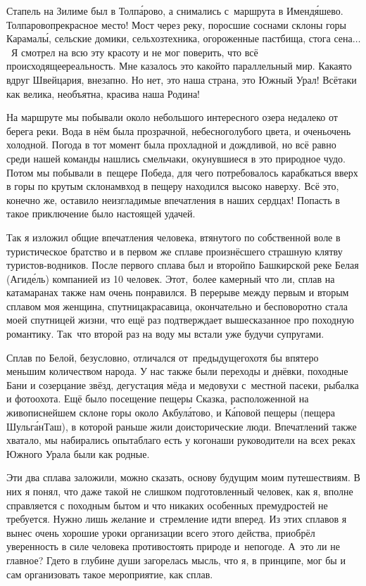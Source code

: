Стапель на Зилиме был в Толп\'{а}рово, а снимались с~маршрута в Именд\'{я}шево. Толпарово\mdash прекрасное место! Мост через реку, поросшие соснами склоны горы Карамал\'{ы}, сельские домики, сельхозтехника, огороженные пастбища, стога сена$\ldots$~Я смотрел на всю эту красоту и не мог поверить, что всё происходящее\mdash реальность. Мне казалось это какой\sdash то параллельный мир. Какая\sdash то вдруг Швейцария, внезапно. Но нет, это наша страна, это Южный Урал! Всё\sdash таки как велика, необъятна, красива наша Родина!

На маршруте мы побывали около небольшого интересного озера недалеко от берега реки. Вода в нём была прозрачной, небесно\sdash голубого цвета, и очень\sdash очень холодной. Погода в тот момент была прохладной и дождливой, но всё равно среди нашей команды нашлись смельчаки, окунувшиеся в это природное чудо. Потом мы побывали в~пещере Победа, для чего потребовалось карабкаться вверх в горы по крутым склонам\mdash вход в пещеру находился высоко наверху. Всё это, конечно же, оставило неизгладимые впечатления в наших сердцах! Попасть в такое приключение было настоящей удачей.

Так я изложил общие впечатления человека, втянутого по собственной воле в туристическое братство и в первом же сплаве произнёсшего страшную клятву туристов-водников. После первого сплава был и второй\mdash по Башкирской реке Белая (Агид\'{е}ль) компанией из 10 человек. Этот,~более камерный что ли, сплав на катамаранах также нам очень понравился. В перерыве между первым и вторым сплавом моя женщина, спутница\sdash красавица, окончательно и бесповоротно стала моей спутницей жизни, что ещё раз подтверждает вышесказанное про походную романтику. Так~что второй раз на воду мы встали уже будучи супругами.

Сплав по Белой, безусловно, отличался от~предыдущего\mdash хотя бы впятеро меньшим количеством народа. У нас также были переходы и днёвки, походные Бани и созерцание звёзд, дегустация мёда и медовухи с~местной пасеки, рыбалка и фотоохота. Ещё было посещение пещеры Сказка, расположенной на живописнейшем склоне горы около Акбул\'{а}тово, и К\'{а}повой пещеры (пещера Шульг\'{а}н\sdash Таш), в которой раньше жили доисторические люди. Впечатлений также хватало, мы набирались опыта\mdash благо есть у кого\mdash наши руководители на всех реках Южного Урала были как родные.

Эти два сплава заложили, можно сказать, основу будущим моим путешествиям. В них я понял, что даже такой не слишком подготовленный человек, как я, вполне справляется с походным бытом и что никаких особенных премудростей не требуется. Нужно лишь желание и~стремление идти вперед. Из этих сплавов я вынес очень хорошие уроки организации всего этого действа, приобрёл уверенность в силе человека противостоять природе и~непогоде. А~это ли не главное? Где\sdash то в глубине души загорелась мысль, что я, в принципе, мог бы и сам организовать такое мероприятие, как сплав.

\begin{center}
\end{center}

